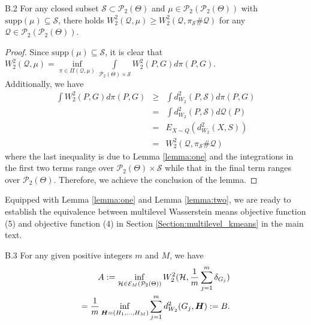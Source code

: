 \begin{customlem}{B.2} \label{lemma:two}
For any closed subset $\mathcal{S} \subset \mathcal{P}_{2}(\Theta)$ and $\mu \in \mathcal{P}_{2}(\mathcal{P}_{2}(\Theta))$ 
with $\text{supp}(\mu) \subseteq \mathcal{S}$, 
there holds 
$W_2^2 (\mathcal{Q},\mu ) \ge W_2^2 (\mathcal{Q},\pi _\mathcal{S} \# \mathcal{Q})$ for any $\mathcal{Q} \in \mathcal{P}_{2}(\mathcal{P}_{2}(\Theta))$.
\end{customlem}
\begin{proof}
Since $\text{supp}(\mu) \subseteq \mathcal{S}$, it is clear that $W_2^2 (\mathcal{Q},\mu) = {\displaystyle \mathop {\inf }\limits_{\pi  \in \Pi (\mathcal{Q},\mu )} \int\limits_{\mathcal{P}_{2}(\Theta) \times \mathcal{S}} {W_{2}^{2}(P,G)} d\pi (P,G)}$.\\
Additionally, we have
\begin{eqnarray}
\int {W_{2}^{2}(P,G)} d\pi (P,G) & \geq & \int {d_{W_{2}}^{2}(P,\mathcal{S})} d\pi (P,G) \nonumber \\
& = &  \int {d_{W_{2}}^{2}(P,\mathcal{S})} d\mathcal{Q}(P) \nonumber \\
& = & E_{X \sim Q} (d_{W_{2}}^{2}(X,S)) \nonumber \\
& = & W_2^2 (\mathcal{Q},\pi _\mathcal{S} \# \mathcal{Q}) \nonumber
\end{eqnarray}
where the last inequality is due to Lemma \ref{lemma:one} and the integrations in the first two terms range over $\mathcal{P}_{2}(\Theta) \times \mathcal{S}$ while that in the final term ranges over $\mathcal{P}_{2}(\Theta)$. Therefore, we achieve the conclusion of the lemma.
\end{proof}
Equipped with Lemma \ref{lemma:one} and Lemma \ref{lemma:two}, 
we are ready to establish 
the equivalence between multilevel Wasserstein means objective function (5) and objective function (4) in Section \ref{Section:multilevel_kmeans} in the main text.
\begin{customlem}{B.3} \label{proposition:Wassersteinequivalence}
For any given positive integers $m$ and $M$, we have
\begin{eqnarray}
A : = \inf \limits_{\mathcal{H} \in \mathcal{E}_{M}(\mathcal{P}_{2}(\Theta))} W_{2}^{2}(\mathcal{H},\dfrac{1}{m}\mathop {\sum }\limits_{j=1}^{m}{\delta_{G_{j}}}) \nonumber \\
= \dfrac{1}{m}\inf \limits_{\boldsymbol{H} = (H_{1},\ldots,H_{M})}\sum \limits_{j=1}^{m} d_{W_{2}}^{2}(G_{j},\boldsymbol{H}) := B. \nonumber
\end{eqnarray}
\end{customlem}

